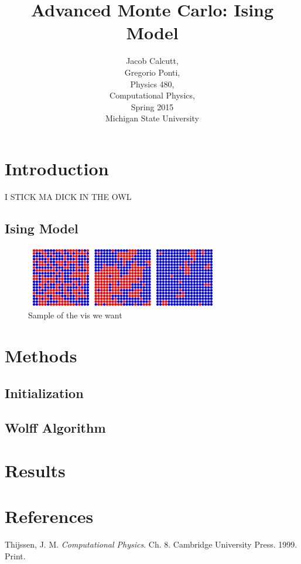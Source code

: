 \documentclass[letterpaper,12pt]{article}
\numberwithin{equation}{subsection}
\begin{document}
\title{\textbf{Advanced Monte Carlo: Ising Model}}
\author{Jacob Calcutt,\\
	Gregorio Ponti,\\
	Physics 480, \\
	Computational Physics,\\
	Spring 2015\\
	Michigan State University}
\maketitle

\newpage
\tableofcontents

\newpage
\section{Introduction}
I STICK MA DICK IN THE OWL
\subsection{Ising Model}
\begin{figure}[H]
        \centering
        \caption{Sample of the vis we want \label{fig:blah}}
                \centering
                \includegraphics[width=0.75\textwidth]{sample_lattice.png}
\end{figure}

\newpage
\section{Methods}
\subsection{Initialization}

\subsection{Wolff Algorithm}


\newpage
\section{Results}

\newpage
\thispagestyle{empty}
\mbox{}

\newpage
\section{References}
\begin{thebibliography}{99}
 Thijssen, J. M. \textit{Computational Physics}. Ch. 8. Cambridge University Press. 1999. Print.
\end{thebibliography}
\end{document}
